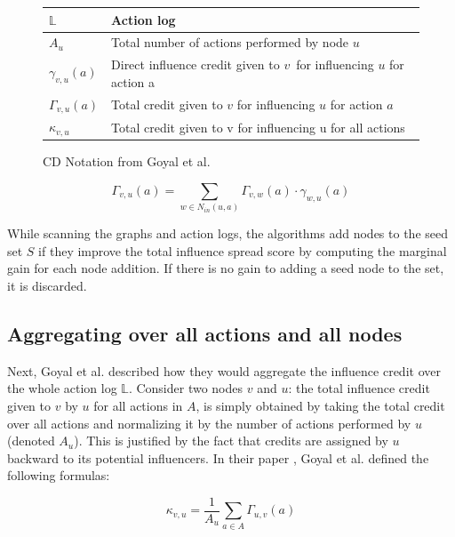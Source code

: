 \documentclass{acm_proc_article-sp}
\begin{document}
\begin{figure}[h]
	\begin{tabulary}{\linewidth}{|l|L|}
			\hline
			$\mathbb{L}$ & Action log \\\hline
			$A_u$ & Total number of actions performed by node $u$ \\\hline
			$\gamma_{v,u}(a)$ & Direct influence credit given to $v$ for influencing $u$ for action a \\\hline
			$\Gamma_{v,u}(a)$ & Total credit given to $v$ for influencing $u$ for action $a$ \\\hline
			$\kappa_{v,u}$ & Total credit given to v for influencing u for all actions \\\hline
	\end{tabulary}
	\caption{CD Notation from Goyal et al. \cite{goyal:datainfluence}}
	\label{notation2}
\end{figure}


\begin{figure}[h]
	\begin{equation}
		\Gamma_{v,u}(a) = \displaystyle\sum_{w \in N_{in}(u,a)} \Gamma_{v,w}(a) \cdot \gamma_{w,u}(a)
	\end{equation}
	\label{CD-formula}
\end{figure}

While scanning the graphs and action logs, the algorithms add nodes to the seed set $S$ if they improve the total influence spread score by computing the marginal gain for each node addition. If there is no gain to adding a seed node to the set, it is discarded.

\subsection*{Aggregating over all actions and all nodes}

Next, Goyal et al. described how they would aggregate the influence credit over the whole action log $\mathbb{L}$. Consider two nodes $v$ and $u$: the total influence credit given to $v$ by $u$ for all actions in $A$, is simply obtained by taking the total credit over all actions and normalizing it by the number of actions performed by $u$ (denoted $A_u$). This is justified by the fact that credits are assigned by $u$ backward to its potential influencers. In their paper \cite{goyal:datainfluence}, Goyal et al. defined the following formulas:

\begin{equation}
	\kappa_{v,u} = \frac{1}{A_u} \displaystyle\sum_{a \in A} \Gamma_{u,v}(a)
\end{equation}
\end{document}
